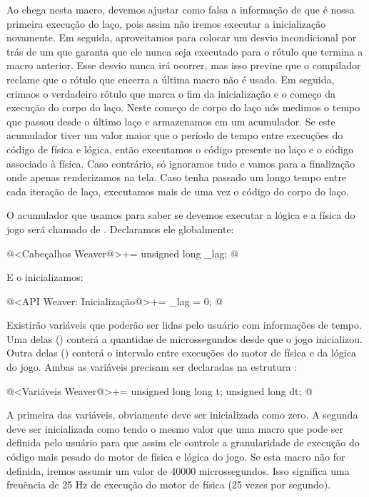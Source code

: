 Ao chega nesta macro, devemos ajustar como falsa a informação de que é
nossa primeira execução do laço, pois assim não iremos executar a
inicialização novamente. Em seguida, aproveitamos para colocar um
desvio incondicional por trás de um  que garanta que
ele nunca seja executado para o rótulo que termina a macro
anterior. Esse desvio nunca irá ocorrer, mas isso previne que o
compilador reclame que o rótulo que encerra a última macro não é
usado. Em seguida, crimaos o verdadeiro rótulo que marca o fim da
inicialização e o começo da execução do corpo do laço. Neste começo de
corpo do laço nós medimos o tempo que passou desde o último laço e
armazenamos em um acumulador. Se este acumulador tiver um valor maior
que o período de tempo entre execuções do código de física e lógica,
então executamos o código presente no laço e o código associado à
física. Caso contrário, só ignoramos tudo e vamos para a finalização
onde apenas renderizamos na tela.  Caso tenha passado um longo tempo
entre cada iteração de laço, executamos mais de uma vez o código do
corpo do laço.

O acumulador que usamos para saber se devemos executar a lógica e a
física do jogo será chamado de . Declaramos ele
globalmente:

\iniciocodigo
@<Cabeçalhos Weaver@>+=
unsigned long _lag;
@
\fimcodigo

E o inicializamos:

@<API Weaver: Inicialização@>+=
_lag = 0;
@

Existirão variáveis que poderão ser lidas pelo usuário com informações
de tempo. Uma delas () conterá a quantidae de
microssegundos desde que o jogo inicializou. Outra delas
() conterá o intervalo entre execuções do motor de
física e da lógica do jogo. Ambas as variáveis precisam ser declaradas
na estrutura :

\iniciocodigo
@<Variáveis Weaver@>+=
unsigned long long t;
unsigned long dt;
@
\fimcodigo

A primeira das variáveis, obviamente deve ser inicializada como
zero. A segunda deve ser inicializada como tendo o mesmo valor que uma
macro  que pode ser definida pelo usuário para
que assim ele controle a granularidade de execução do código mais
pesado do motor de física e lógica do jogo. Se esta macro não for
definida, iremos assumir um valor de 40000 microssegundos. Isso
significa uma freuência de 25 Hz de execução do motor de física (25
vezes por segundo).

